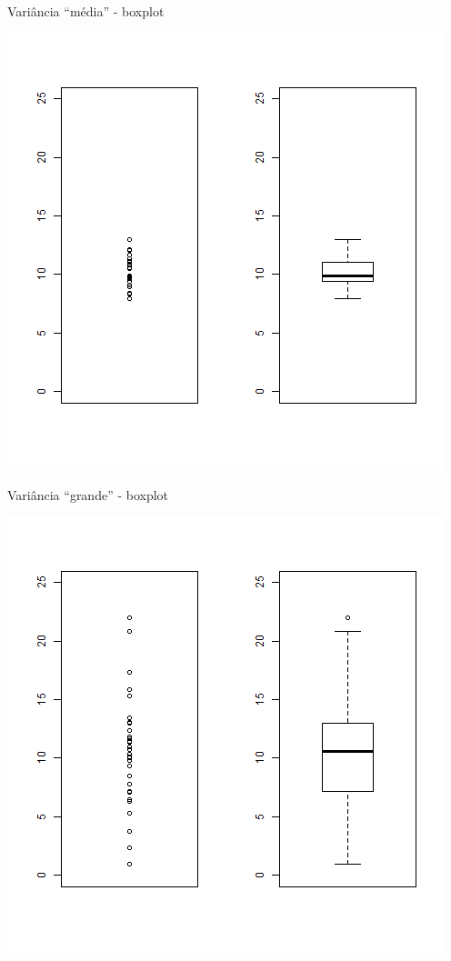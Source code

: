 \documentclass{beamer}
\begin{document}
\begin{frame}{Variância ``média'' - boxplot}
  \begin{center}
    \includegraphics[height=.8\textheight]{Cap17/dot-box-M}
  \end{center}
\end{frame}

\begin{frame}{Variância ``grande'' - boxplot}
  \begin{center}
    \includegraphics[height=.8\textheight]{Cap17/dot-box-G}
  \end{center}
\end{frame}
\end{document}
